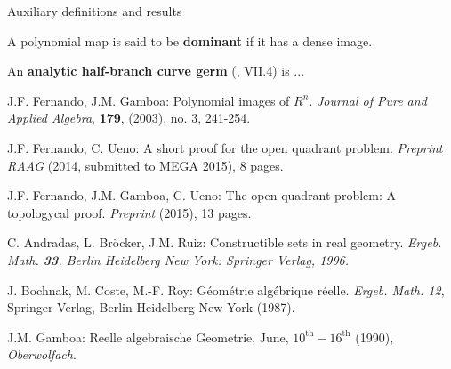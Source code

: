 \documentclass[11pt, a4paper, english, twoside, notitlepage]{report}
\begin{document}
\begin{chapter}{Auxiliary definitions and results}
\begin{definition}\label{dominant}
	A polynomial map is said to be \textbf{dominant} if it has a dense image. 
\end{definition}

\begin{definition}\label{curveGerms}
	An \textbf{analytic half-branch curve germ} (\cite{bcr}, VII.4) is ... 
\end{definition}

\end{chapter}


\begin{thebibliography}{10}

 J.F. Fernando, J.M. Gamboa: Polynomial images of $R^n$.
\textit{Journal of Pure and Applied Algebra}, {\bf 179}, (2003), no. 3, 241-254.

 J.F. Fernando, C. Ueno: A short proof for the open quadrant problem.
\textit{Preprint RAAG} (2014, submitted to MEGA 2015), 8 pages.

 J.F. Fernando, J.M. Gamboa, C. Ueno: The open quadrant problem:
A topologycal proof. \textit{Preprint} (2015), 13 pages.

 C. Andradas, L. Br\"ocker, J.M. Ruiz: Constructible 
sets in real geometry.  \em Ergeb.  Math.  \em {\bf 33}.  Berlin Heidelberg 
New York: Springer Verlag, 1996.

 J. Bochnak, M. Coste, M.-F. Roy: G\'eom\'etrie
alg\'ebrique r\'eelle. {\em Ergeb. Math. 12}, Springer-Verlag,
Berlin Heidelberg New York (1987).

 J.M. Gamboa: Reelle algebraische Geometrie, June,
$10^{\text{th}}-16^{\text{th}}$ (1990), \textit{Oberwolfach}.

\end{thebibliography}
\end{document}

